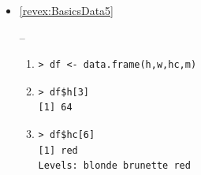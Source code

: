\documentclass[10pt,openany]{book}\usepackage[]{graphicx}\usepackage[]{color}
\makeatletter
\newenvironment{kframe}{%
 \def\at@end@of@kframe{}%
 \ifinner\ifhmode%
  \def\at@end@of@kframe{\end{minipage}}%
  \begin{minipage}{\columnwidth}%
 \fi\fi%
 \def\FrameCommand##1{\hskip\@totalleftmargin \hskip-\fboxsep
 \colorbox{shadecolor}{##1}\hskip-\fboxsep
     \hskip-\linewidth \hskip-\@totalleftmargin \hskip\columnwidth}%
 \MakeFramed {\advance\hsize-\width
   \@totalleftmargin\z@ \linewidth\hsize
   \@setminipage}}%
 {\par\unskip\endMakeFramed%
 \at@end@of@kframe}
\newenvironment{knitrout}{}{} %
\makeatother
\begin{document}
\begin{itemize}
  \item \hypertarget{ans:BasicsData5}{\ref{revex:BasicsData5}} --
    \begin{enumerate}
      \item
\begin{knitrout}
\color{fgcolor}\begin{kframe}
\begin{verbatim}
> df <- data.frame(h,w,hc,m)
\end{verbatim}
\end{kframe}
\end{knitrout}
      \item
\begin{knitrout}
\color{fgcolor}\begin{kframe}
\begin{verbatim}
> df$h[3]
[1] 64
\end{verbatim}
\end{kframe}
\end{knitrout}
      \item
\begin{knitrout}
\color{fgcolor}\begin{kframe}
\begin{verbatim}
> df$hc[6]
[1] red
Levels: blonde brunette red
\end{verbatim}
\end{kframe}
\end{knitrout}
    \end{enumerate}


\end{itemize}
\end{document}
